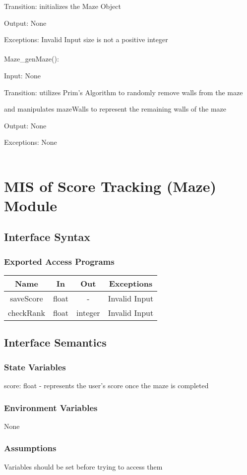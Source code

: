\documentclass[12pt, titlepage]{article}
\begin{document}
		Transition: initializes the Maze Object
		
		Output: None
		
		Exceptions: Invalid Input size is not a positive integer\\
		\\
		Maze\_genMaze():
		
		Input: None
		
		Transition: utilizes Prim's Algorithm to randomly remove walls from the maze 
		
		and manipulates mazeWalls to represent the remaining walls of the maze
		
		Output: None
		
		Exceptions: None\\
        \\
\section{MIS of Score Tracking (Maze) Module}
		\subsection{Interface Syntax}
		\subsubsection{Exported Access Programs}
		\begin{tabular}[pos]{|c|c|c|c|}
			\hline
			\textbf{Name}& \textbf{In} & \textbf{Out} & \textbf{Exceptions} \\ \hline
			saveScore & float & - & Invalid Input \\ \hline
			checkRank & float & integer & Invalid Input \\ \hline
		\end{tabular}
		
		\subsection{Interface Semantics}
		\subsubsection{State Variables}
		score: float - represents the user's score once the maze is completed
		\subsubsection{Environment Variables}
		None
		\subsubsection{Assumptions}
		Variables should be set before trying to access them
		
\end{document}
